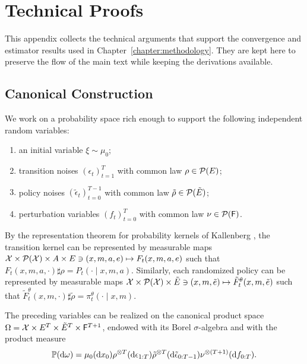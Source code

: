 \appendix

\chapter{Technical Proofs}
\label{appendix:technical-proofs}

This appendix collects the technical arguments that support the convergence and estimator results used in Chapter~\ref{chapter:methodology}. They are kept here to preserve the flow of the main text while keeping the derivations available.

\section{Canonical Construction}
\label{appendix:canonical-construction}

We work on a probability space rich enough to support the following independent random variables:
\begin{enumerate}
    \item an initial variable $\xi\sim\mu_0$;
    \item transition noises $(\epsilon_t)_{t=1}^{T}$ with common law $\rho\in{\cal P}(E)$;
    \item policy noises $(\tilde\epsilon_t)_{t=0}^{T-1}$ with common law $\tilde\rho\in{\cal P}(\tilde E)$;
    \item perturbation variables $(f_t)_{t=0}^{T}$ with common law $\nu\in{\cal P}(\mathsf F)$.
\end{enumerate}
By the representation theorem for probability kernels of Kallenberg \cite{kallenberg1997foundations}, the transition kernel can be represented by measurable maps ${\cal X}\times{\cal P}({\cal X})\times A\times E \ni(x,m,a,e)\mapsto F_t(x,m,a,e)$ such that $F_t(x,m,a,\cdot)\sharp\rho=P_t(\cdot\mid x,m,a)$. Similarly, each randomized policy can be represented by measurable maps ${\cal X}\times{\cal P}({\cal X})\times\tilde E\ni(x,m,\tilde e)\mapsto\tilde F_t^\theta(x,m,\tilde e)$ such that $\tilde F_t^\theta(x,m,\cdot)\sharp \tilde\rho= \pi_t^\theta(\cdot\mid x,m)$.

\begin{remark}
    The preceding variables can be realized on the canonical product space $\Omega={\cal X}\times E^T\times\tilde E^T\times\mathsf F^{T+1}$, endowed with its Borel $\sigma$-algebra and with the product measure
    \begin{align}
        \mathbb{P}(\mathrm{d}\omega)
        =
        \mu_0(\mathrm{d} x_0)
        \rho^{\otimes T}(\mathrm{d}\epsilon_{1:T})
        \tilde\rho^{\otimes T}(\mathrm{d}\tilde\epsilon_{0:T-1})
        \nu^{\otimes(T+1)}(\mathrm{d} f_{0:T}).
    \end{align}
\end{remark}

